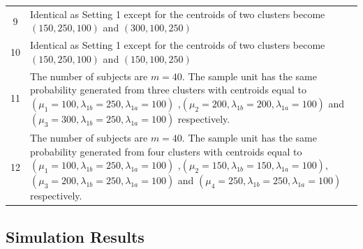 \documentclass[12pt]{article}
\begin{document}
\begin{table}[htp]
\begin{tabular}{cl}
9& \multicolumn{1}{p{14.5cm}}{Identical as Setting 1  except for the centroids of two clusters become $(150,250,100)$ and $(300,100,250)$}\\

10& \multicolumn{1}{p{14.5cm}}{Identical as Setting 1  except for the centroids of two clusters become $(150,250,100)$ and $(150,100,250)$}\\
   
11& \multicolumn{1}{p{14.5cm}}{The number of subjects are $m=40$. The sample unit has the same probability generated from three clusters with centroids equal to $(\mu_1=100,\lambda_{1b}=250,\lambda_{1a}=100)$ ,$(\mu_2=200,\lambda_{1b}=200,\lambda_{1a}=100)$ and $(\mu_3=300,\lambda_{1b}=250,\lambda_{1a}=100)$ respectively.}\\

12& \multicolumn{1}{p{14.5cm}}{The number of subjects are $m=40$. The sample unit has the same probability generated from four clusters with centroids equal to $(\mu_1=100,\lambda_{1b}=250,\lambda_{1a}=100)$ ,$(\mu_2=150,\lambda_{1b}=150,\lambda_{1a}=100)$, $(\mu_3=200,\lambda_{1b}=250,\lambda_{1a}=100)$ and $(\mu_4=250,\lambda_{1b}=250,\lambda_{1a}=100)$ respectively.}\\\hline
  

    \end{tabular}%
\end{table}%
\subsection{Simulation Results}
\end{document}
